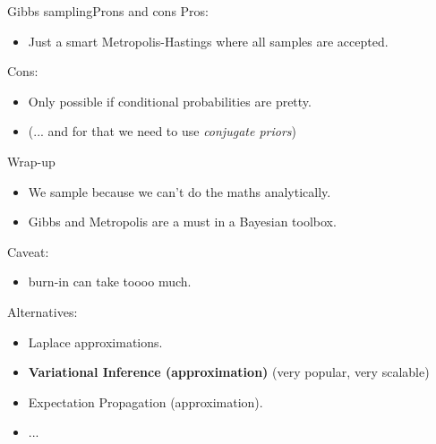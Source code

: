 \documentclass{beamer}
\begin{document}
\begin{frame}{Gibbs sampling}{Prons and cons}
	Pros:
	\begin{itemize}
		\item Just a smart Metropolis-Hastings where all samples are accepted.
	\end{itemize}
	Cons:
	\begin{itemize}
		\item Only possible if conditional probabilities are pretty.
		\item (... and for that we need to use \textit{conjugate priors})
	\end{itemize}
\end{frame}


\begin{frame}{Wrap-up}
	\begin{itemize}
	\item We sample because we can't do the maths analytically.
	\item Gibbs and Metropolis are a must in a Bayesian toolbox.
	\end{itemize}
	Caveat:
	\begin{itemize}
		\item burn-in can take toooo much.
	\end{itemize}
	Alternatives:
	\begin{itemize}
		\item Laplace approximations.
		\item\textbf{ Variational Inference (approximation)} (very popular, very scalable)
		\item Expectation Propagation (approximation).
		\item ...	
	\end{itemize}
\end{frame}
\end{document}

